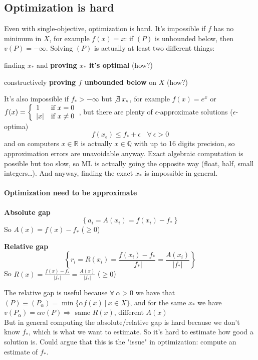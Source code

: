 \documentclass[10pt]{report}
\begin{document}
\subsection{Optimization is hard}
Even with single-objective, optimization is hard. It's impossible if $f$ has no minimum in $X$, for example $f(x) = x$: if $(P)$ is unbounded below, then $v(P) = -\infty$. Solving $(P)$ is actually at least two different things:
\begin{list}{}{}
	\item finding $x_*$ and \textbf{proving $x_*$ it's optimal} (how?)
	\item constructively \textbf{proving $f$ unbounded below} on $X$ (how?)
\end{list}
It's also impossible if $f_* > -\infty$ but $\not\exists\:x_*$, for example $f(x) = e^x$ or $f(x)=\left\{\begin{array}{l l}
1&\text{if }x = 0\\
|x|&\text{if }x \neq 0
\end{array}\right.$, but there are plenty of $\epsilon$-approximate solutions ($\epsilon$-optima) $$f(x_\epsilon)\leq f_* + \epsilon\:\:\:\:\forall\:\epsilon>0$$
and on computers $x\in \mathbb{R}$ is actually $x\in \mathbb{Q}$ with up to 16 digits precision, so approximation errors are unavoidable anyway. Exact algebraic computation is possible but too slow, so ML is actually going the opposite way (float, half, small integers\ldots). And anyway, finding the exact $x_*$ is impossible in general.
\paragraph{Optimization need to be approximate} \begin{list}{}{}
	\item \textbf{Absolute gap} $$\left\{a_i = A(x_i) = f(x_i) - f_*\right\}$$ So $A(x) = f(x) - f_*$ ($\geq 0$)
	\item \textbf{Relative gap} $$\left\{r_i = R(x_i) = \frac{f(x_i) - f_*}{|f_*|} = \frac{A(x_i)}{|f_*|}\right\}$$ So $R(x) = \frac{\displaystyle f(x) - f_*}{\displaystyle |f_*|} = \frac{\displaystyle A(x)}{\displaystyle |f_*|}$ ($\geq 0$)
\end{list}
The relative gap is useful because $\forall\:\alpha>0$ we have that $(P)\equiv (P_\alpha) = \min\{\alpha f(x)\:|\:x\in X\}$, and for the same $x_*$ we have $v(P_\alpha) = \alpha v(P) \Rightarrow$ same $R(x)$, different $A(x)$\\
But in general computing the absolute/relative gap is hard because we don't know $f_*$, which is what we want to estimate. So it's hard to estimate how good a solution is. Could argue that this is the "issue" in optimization: compute an estimate of $f_*$.
\end{document}
